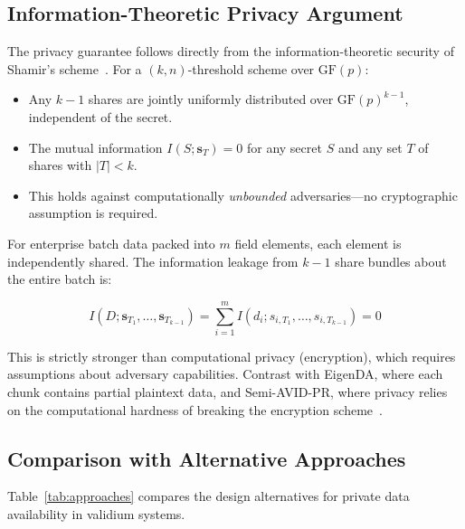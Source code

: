 \subsection{Information-Theoretic Privacy Argument}

The privacy guarantee follows directly from the information-theoretic security
of Shamir's scheme~\cite{shamir1979share}. For a $(k,n)$-threshold scheme
over $\mathrm{GF}(p)$:

\begin{itemize}
\item Any $k-1$ shares are jointly uniformly distributed over
  $\mathrm{GF}(p)^{k-1}$, independent of the secret.
\item The mutual information $I(S; \mathbf{s}_{T}) = 0$ for any secret $S$
  and any set $T$ of shares with $|T| < k$.
\item This holds against computationally \emph{unbounded} adversaries---no
  cryptographic assumption is required.
\end{itemize}

For enterprise batch data packed into $m$ field elements, each element is
independently shared. The information leakage from $k-1$ share bundles
about the entire batch is:

\begin{equation}
I(D; \mathbf{s}_{T_1}, \ldots, \mathbf{s}_{T_{k-1}}) =
\sum_{i=1}^{m} I(d_i; s_{i,T_1}, \ldots, s_{i,T_{k-1}}) = 0
\label{eq:privacy}
\end{equation}

\noindent This is strictly stronger than computational privacy (encryption),
which requires assumptions about adversary capabilities. Contrast with
EigenDA, where each chunk contains partial plaintext data, and Semi-AVID-PR,
where privacy relies on the computational hardness of breaking the encryption
scheme~\cite{nazirkhanova2022semiavidpr}.

\subsection{Comparison with Alternative Approaches}

Table~\ref{tab:approaches} compares the design alternatives for private
data availability in validium systems.

